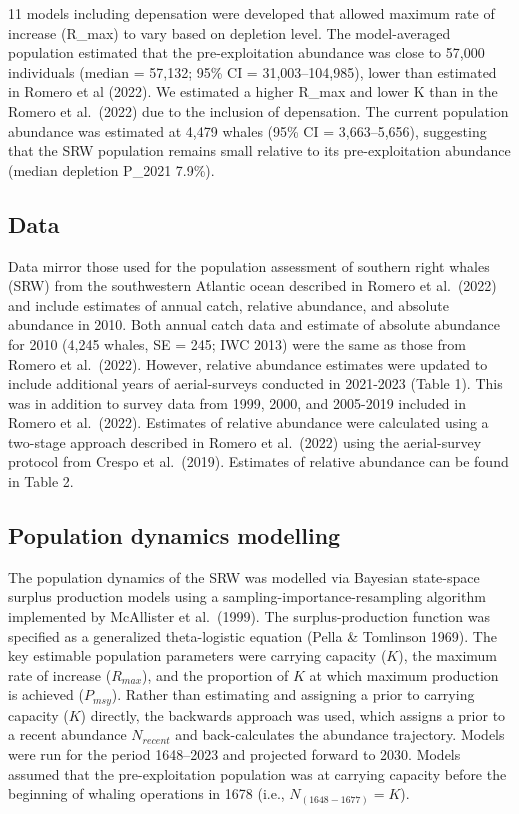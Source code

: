 \documentclass[
]{article}
\begin{document}
11 models including depensation were developed that allowed maximum rate
of increase (R\_max) to vary based on depletion level. The
model-averaged population estimated that the pre-exploitation abundance
was close to 57,000 individuals (median = 57,132; 95\% CI =
31,003--104,985), lower than estimated in Romero et al (2022). We
estimated a higher R\_max and lower K than in the Romero et al.~(2022)
due to the inclusion of depensation. The current population abundance
was estimated at 4,479 whales (95\% CI = 3,663--5,656), suggesting that
the SRW population remains small relative to its pre-exploitation
abundance (median depletion P\_2021 7.9\%).

\hypertarget{data}{%
\subsection{Data}\label{data}}

Data mirror those used for the population assessment of southern right
whales (SRW) from the southwestern Atlantic ocean described in Romero et
al.~(2022) and include estimates of annual catch, relative abundance,
and absolute abundance in 2010. Both annual catch data and estimate of
absolute abundance for 2010 (4,245 whales, SE = 245; IWC 2013) were the
same as those from Romero et al.~(2022). However, relative abundance
estimates were updated to include additional years of aerial-surveys
conducted in 2021-2023 (Table 1). This was in addition to survey data
from 1999, 2000, and 2005-2019 included in Romero et al.~(2022).
Estimates of relative abundance were calculated using a two-stage
approach described in Romero et al.~(2022) using the aerial-survey
protocol from Crespo et al.~(2019). Estimates of relative abundance can
be found in Table 2.

\hypertarget{population-dynamics-modelling}{%
\subsection{Population dynamics
modelling}\label{population-dynamics-modelling}}

The population dynamics of the SRW was modelled via Bayesian state-space
surplus production models using a sampling-importance-resampling
algorithm implemented by McAllister et al.~(1999). The
surplus-production function was specified as a generalized
theta-logistic equation (Pella \& Tomlinson 1969). The key estimable
population parameters were carrying capacity (\(K\)), the maximum rate
of increase (\(R_{max}\)), and the proportion of \(K\) at which maximum
production is achieved (\(P_{msy}\)). Rather than estimating and
assigning a prior to carrying capacity (\(K\)) directly, the backwards
approach was used, which assigns a prior to a recent abundance
\(N_{recent}\) and back-calculates the abundance trajectory. Models were
run for the period 1648--2023 and projected forward to 2030. Models
assumed that the pre-exploitation population was at carrying capacity
before the beginning of whaling operations in 1678 (i.e.,
\(N_{(1648-1677)}=K\)).
\end{document}
